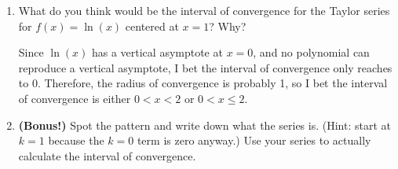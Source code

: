 \documentclass[10pt]{article}
\newenvironment{red}{\color{red}}{\ignorespacesafterend}
\begin{document}
\begin{enumerate}[leftmargin=0pt]
\begin{enumerate}
\begin{red}
    So, to be sure we have the first two decimal places correct, we want the result of the Lagrange error bound to be less than $0.001$:
    \begin{align*}
        \frac{M\ |c-a|^{n+1}}{(n+1)!} &< 0.001 = \frac{1}{1000} \\
        \frac{n!\ |2-1|^{n+1}}{(n+1)!} &< \frac{1}{1000} \\
        \frac{1}{n+1} &< \frac{1}{1000}
    \end{align*}
    Wow, so we need $n+1 > 1000$! Therefore we need to go out to the 1000th Taylor polynomial to even be sure that we're accurate to within two decimal places!
    
    (Okay, I guess if we think about this a little more, we just need to be accurate to within 0.005, because of how rounding works, and that'll give us something more like $n=200$, but still, dang!)
    
    Conclusions: the Taylor series for $\ln(x)$ converges exceptionally slowly; probably there has to be some kind of better way to produce rational approximations to values of the natural logarithm.
    \end{red}
    \item What do you think would be the interval of convergence for the Taylor series for $f(x) = \ln(x)$ centered at $x=1$? Why?
    
    \begin{red}
    Since $\ln(x)$ has a vertical asymptote at $x=0$, and no polynomial can reproduce a vertical asymptote, I bet the interval of convergence only reaches to 0. Therefore, the radius of convergence is probably 1, so I bet the interval of convergence is either $0 < x < 2$ or $0 < x \leq 2$.
    \end{red}
    \item \textbf{(Bonus!)} Spot the pattern and write down what the series is. (Hint: start at $k=1$ because the $k=0$ term is zero anyway.) Use your series to actually calculate the interval of convergence.
    

\end{enumerate}
\end{enumerate}
\end{document}
